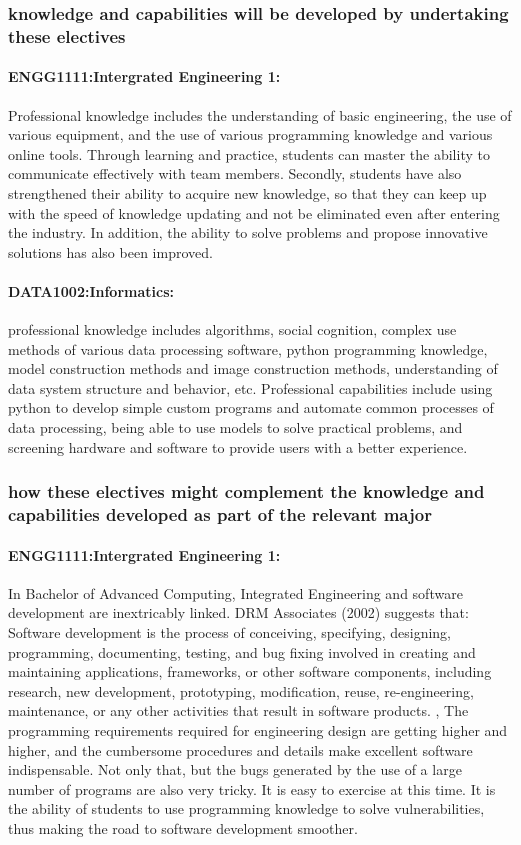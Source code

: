 \documentclass[../draft.tex]{subfiles}
\begin{document}
\subsubsection{knowledge and capabilities will be developed by undertaking these electives} 
\paragraph{ENGG1111:Intergrated Engineering 1:} 
Professional knowledge includes the understanding of basic engineering, the use of various equipment, and the use of various programming knowledge and various online tools. Through learning and practice, students can master the ability to communicate effectively with team members. Secondly, students have also strengthened their ability to acquire new knowledge, so that they can keep up with the speed of knowledge updating and not be eliminated even after entering the industry. In addition, the ability to solve problems and propose innovative solutions has also been improved.
\paragraph{DATA1002:Informatics:}
professional knowledge includes algorithms, social cognition, complex use methods of various data processing software, python programming knowledge, model construction methods and image construction methods, understanding of data system structure and behavior, etc. Professional capabilities include using python to develop simple custom programs and automate common processes of data processing, being able to use models to solve practical problems, and screening hardware and software to provide users with a better experience.
\subsubsection{how these electives might complement the knowledge and capabilities developed as part of the relevant major}
\paragraph{ENGG1111:Intergrated Engineering 1:} 
In Bachelor of Advanced Computing, Integrated Engineering and software development are inextricably linked. DRM Associates (2002) suggests that: Software development is the process of conceiving, specifying, designing, programming, documenting, testing, and bug fixing involved in creating and maintaining applications, frameworks, or other software components, including research, new development, prototyping, modification, reuse, re-engineering, maintenance, or any other activities that result in software products. , The programming requirements required for engineering design are getting higher and higher, and the cumbersome procedures and details make excellent software indispensable. Not only that, but the bugs generated by the use of a large number of programs are also very tricky. It is easy to exercise at this time. It is the ability of students to use programming knowledge to solve vulnerabilities, thus making the road to software development smoother.
\end{document}
